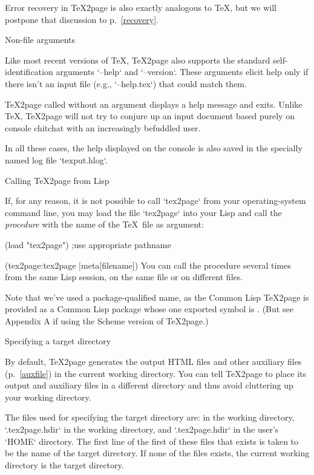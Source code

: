 Error recovery in \TeX2page is also exactly analogous to
\TeX, but we will postpone that discussion to
p.~\ref{recovery}.

\beginsection Non-file arguments

%
%
Like most recent versions of \TeX, \TeX2page also
supports the standard self-identification
arguments `--help` and `--version`.  These
arguments elicit help only if there isn’t an input file
(e.g., `--help.tex`) that could match them.

\TeX2page called without an argument displays a help
message and exits.  Unlike \TeX, \TeX2page will not try
to conjure up an input document based purely on console
chitchat with an increasingly befuddled user.

In all these cases, the help displayed on the console
is also saved in the specially named log file
`texput.hlog`.

\beginsection Calling \TeX2page from Lisp

%
If, for any reason, it is not possible to call `tex2page`
from your operating-system command line, you may load the
file `tex2page` into your Lisp
and call the
{\em procedure}  with the name of the \TeX\ file
as argument:

\begintts
(load "tex2page") ;use appropriate pathname

(tex2page:tex2page |meta[filename])
\endtt
You can call the procedure
 several times from the same Lisp
session, on the same file or on different files.

Note that we’ve used a package-qualified name, as the Common
Lisp \TeX2page is provided as a Common Lisp package 
whose one exported symbol is . (But see Appendix A if
using the Scheme version of \TeX2page.)

\beginsection Specifying a target directory

%
By default, \TeX2page generates the output HTML files
and other auxiliary files (p.~\ref{auxfile}) in the
current working directory.  You can tell \TeX2page
to place its output and auxiliary files in a different
directory and thus avoid cluttering up your working
directory.

The files used for specifying the target directory are:
 in the working directory,
`.tex2page.hdir` in the working directory, and
`.tex2page.hdir` in the user’s `HOME` directory.
The first line of the first of these files that exists
is taken to be the name of the target directory.
If none of the files exists, the current working
directory is the target directory.


